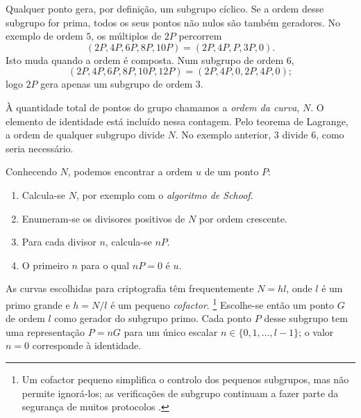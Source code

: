 Qualquer ponto gera, por definição, um subgrupo cíclico. Se a ordem desse
subgrupo for prima, todos os seus pontos não nulos são também geradores. No
exemplo de ordem \(5\), os múltiplos de \(2P\) percorrem
\[
(2P,4P,6P,8P,10P)=(2P,4P,P,3P,0).
\]
Isto muda quando a ordem é composta. Num subgrupo de ordem \(6\),
\[
(2P,4P,6P,8P,10P,12P)=(2P,4P,0,2P,4P,0);
\]
logo \(2P\) gera apenas um subgrupo de ordem \(3\).

À quantidade total de pontos do grupo chamamos a {\em ordem da curva}, \(N\).
O elemento de identidade está incluído nessa contagem. Pelo teorema de
Lagrange, a ordem de qualquer subgrupo divide \(N\). No exemplo anterior,
\(3\) divide \(6\), como seria necessário.


Conhecendo \(N\), podemos encontrar a ordem \(u\) de um ponto \(P\):
\begin{enumerate}
    \item Calcula-se \(N\), por exemplo com o {\em algoritmo de Schoof}.
    \item Enumeram-se os divisores positivos de \(N\) por ordem crescente.
    \item Para cada divisor \(n\), calcula-se \(nP\).
    \item O primeiro \(n\) para o qual \(nP=0\) é \(u\).
\end{enumerate} 

As curvas escolhidas para criptografia têm frequentemente \(N=hl\), onde
\(l\) é um primo grande e \(h=N/l\) é um pequeno {\em cofactor}.
\footnote{Um cofactor pequeno simplifica o controlo dos pequenos subgrupos,
mas não permite ignorá-los; as verificações de subgrupo continuam a fazer
parte da segurança de muitos protocolos \cite{Bernstein2008}.}
Escolhe-se então um ponto \(G\) de ordem \(l\) como gerador do subgrupo primo.
Cada ponto \(P\) desse subgrupo tem uma representação \(P=nG\) para um único
escalar \(n\in\{0,1,\ldots,l-1\}\); o valor \(n=0\) corresponde à identidade.

